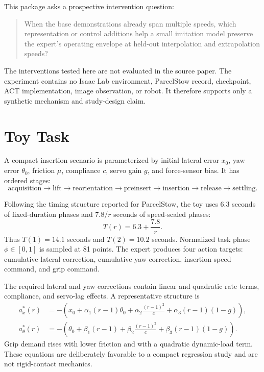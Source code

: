 \documentclass[11pt]{article}
\begin{document}
This package asks a prospective intervention question:
\begin{quote}
When the base demonstrations already span multiple speeds, which representation or control additions help a small imitation model preserve the expert's operating envelope at held-out interpolation and extrapolation speeds?
\end{quote}

The interventions tested here are not evaluated in the source paper. The experiment contains no Isaac Lab environment, ParcelStow record, checkpoint, ACT implementation, image observation, or robot. It therefore supports only a synthetic mechanism and study-design claim.

\section{Toy Task}

A compact insertion scenario is parameterized by initial lateral error $x_0$, yaw error $\theta_0$, friction $\mu$, compliance $c$, servo gain $g$, and force-sensor bias. It has ordered stages:
\[
\text{acquisition}\rightarrow\text{lift}\rightarrow\text{reorientation}\rightarrow
\text{preinsert}\rightarrow\text{insertion}\rightarrow\text{release}\rightarrow\text{settling}.
\]

Following the timing structure reported for ParcelStow, the toy uses 6.3 seconds of fixed-duration phases and $7.8/r$ seconds of speed-scaled phases:
\begin{equation}
T(r)=6.3+\frac{7.8}{r}.
\end{equation}
Thus $T(1)=14.1$ seconds and $T(2)=10.2$ seconds. Normalized task phase $\phi\in[0,1]$ is sampled at 81 points. The expert produces four action targets: cumulative lateral correction, cumulative yaw correction, insertion-speed command, and grip command.

The required lateral and yaw corrections contain linear and quadratic rate terms, compliance, and servo-lag effects. A representative structure is
\begin{align}
a_x^*(r) &=-\left(x_0 + \alpha_1(r-1)\theta_0+\alpha_2\frac{(r-1)^2}{c}+\alpha_3(r-1)(1-g)\right),\\
a_\theta^*(r) &=-\left(\theta_0+\beta_1(r-1)+\beta_2\frac{(r-1)^2}{c}+\beta_3(r-1)(1-g)\right).
\end{align}
Grip demand rises with lower friction and with a quadratic dynamic-load term. These equations are deliberately favorable to a compact regression study and are not rigid-contact mechanics.
\end{document}
